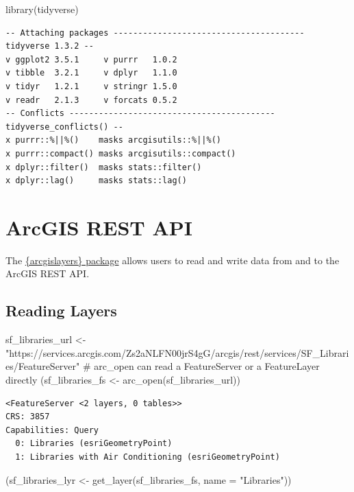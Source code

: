 \documentclass[
  letterpaper,
  DIV=11,
  numbers=noendperiod]{scrreprt}
\newenvironment{Shaded}{\begin{snugshade}}{\end{snugshade}}
\newcommand{\AttributeTok}[1]{\textcolor[rgb]{0.40,0.45,0.13}{#1}}
\newcommand{\CommentTok}[1]{\textcolor[rgb]{0.37,0.37,0.37}{#1}}
\newcommand{\FunctionTok}[1]{\textcolor[rgb]{0.28,0.35,0.67}{#1}}
\newcommand{\NormalTok}[1]{\textcolor[rgb]{0.00,0.23,0.31}{#1}}
\newcommand{\OtherTok}[1]{\textcolor[rgb]{0.00,0.23,0.31}{#1}}
\newcommand{\StringTok}[1]{\textcolor[rgb]{0.13,0.47,0.30}{#1}}
\begin{document}
\begin{Shaded}
\begin{Highlighting}[]
\FunctionTok{library}\NormalTok{(tidyverse)}
\end{Highlighting}
\end{Shaded}

\begin{verbatim}
-- Attaching packages --------------------------------------- tidyverse 1.3.2 --
v ggplot2 3.5.1     v purrr   1.0.2
v tibble  3.2.1     v dplyr   1.1.0
v tidyr   1.2.1     v stringr 1.5.0
v readr   2.1.3     v forcats 0.5.2
-- Conflicts ------------------------------------------ tidyverse_conflicts() --
x purrr::%||%()    masks arcgisutils::%||%()
x purrr::compact() masks arcgisutils::compact()
x dplyr::filter()  masks stats::filter()
x dplyr::lag()     masks stats::lag()
\end{verbatim}

\section{ArcGIS REST API}\label{arcgis-rest-api}

The \href{https://github.com/R-ArcGIS/arcgislayers}{\{arcgislayers\}
package} allows users to read and write data from and to the ArcGIS REST
API.

\subsection{Reading Layers}\label{reading-layers}

\begin{Shaded}
\begin{Highlighting}[]
\NormalTok{sf\_libraries\_url }\OtherTok{\textless{}{-}} \StringTok{"https://services.arcgis.com/Zs2aNLFN00jrS4gG/arcgis/rest/services/SF\_Libraries/FeatureServer"}
\CommentTok{\# arc\_open can read a FeatureServer or a FeatureLayer directly}
\NormalTok{(sf\_libraries\_fs }\OtherTok{\textless{}{-}} \FunctionTok{arc\_open}\NormalTok{(sf\_libraries\_url))}
\end{Highlighting}
\end{Shaded}

\begin{verbatim}
<FeatureServer <2 layers, 0 tables>>
CRS: 3857
Capabilities: Query
  0: Libraries (esriGeometryPoint)
  1: Libraries with Air Conditioning (esriGeometryPoint)
\end{verbatim}

\begin{Shaded}
\begin{Highlighting}[]
\NormalTok{(sf\_libraries\_lyr }\OtherTok{\textless{}{-}} \FunctionTok{get\_layer}\NormalTok{(sf\_libraries\_fs, }\AttributeTok{name =} \StringTok{"Libraries"}\NormalTok{))}
\end{Highlighting}
\end{Shaded}
\end{document}
